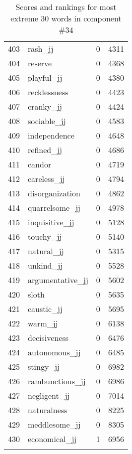\begin{longtable}[!htbp]{| rlr@{.}l |}
    403 & rash\_jj & 0 & 4311 \\
    404 & reserve & 0 & 4368 \\
    405 & playful\_jj & 0 & 4380 \\
    406 & recklessness & 0 & 4423 \\
    407 & cranky\_jj & 0 & 4424 \\
    408 & sociable\_jj & 0 & 4583 \\
    409 & independence & 0 & 4648 \\
    410 & refined\_jj & 0 & 4686 \\
    411 & candor & 0 & 4719 \\
    412 & careless\_jj & 0 & 4794 \\
    413 & disorganization & 0 & 4862 \\
    414 & quarrelsome\_jj & 0 & 4978 \\
    415 & inquisitive\_jj & 0 & 5128 \\
    416 & touchy\_jj & 0 & 5140 \\
    417 & natural\_jj & 0 & 5315 \\
    418 & unkind\_jj & 0 & 5528 \\
    419 & argumentative\_jj & 0 & 5602 \\
    420 & sloth & 0 & 5635 \\
    421 & caustic\_jj & 0 & 5695 \\
    422 & warm\_jj & 0 & 6138 \\
    423 & decisiveness & 0 & 6476 \\
    424 & autonomous\_jj & 0 & 6485 \\
    425 & stingy\_jj & 0 & 6982 \\
    426 & rambunctious\_jj & 0 & 6986 \\
    427 & negligent\_jj & 0 & 7014 \\
    428 & naturalness & 0 & 8225 \\
    429 & meddlesome\_jj & 0 & 8305 \\
    430 & economical\_jj & 1 & 6956 \\
    \hline
    \caption{Scores and rankings for most extreme 30 words in component \#34} \\
\end{longtable}
